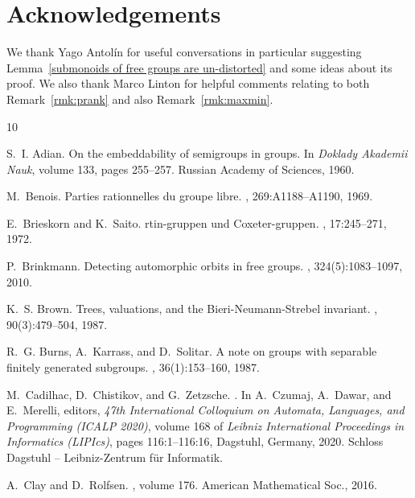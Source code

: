\documentclass[11pt]{amsart}
\theoremstyle{plain}
\theoremstyle{definition}
\begin{document}
\section*{Acknowledgements} 
We thank Yago Antol\'{i}n for useful conversations in particular suggesting Lemma~\ref{submonoids of free groups are un-distorted} and some ideas about its proof.  We also thank Marco Linton for helpful comments relating to both Remark~\ref{rmk:prank} and also Remark~\ref{rmk:maxmin}.   



\begin{thebibliography}{10}

S.~I. Adian.
\newblock On the embeddability of semigroups in groups.
\newblock In {\em Doklady Akademii Nauk}, volume 133, pages 255--257. Russian
  Academy of Sciences, 1960.

M.~Benois.
\newblock Parties rationnelles du groupe libre.
, 269:A1188--A1190, 1969.

E.~Brieskorn and K.~Saito.
rtin-gruppen und {C}oxeter-gruppen.
, 17:245--271, 1972.

P.~Brinkmann.
\newblock Detecting automorphic orbits in free groups.
, 324(5):1083--1097, 2010.

K.~S. Brown.
\newblock Trees, valuations, and the {B}ieri-{N}eumann-{S}trebel invariant.
, 90(3):479--504, 1987.

R.~G. Burns, A.~Karrass, and D.~Solitar.
\newblock A note on groups with separable finitely generated subgroups.
, 36(1):153--160, 1987.

M.~Cadilhac, D.~Chistikov, and G.~Zetzsche.
.
\newblock In A.~Czumaj, A.~Dawar, and E.~Merelli, editors, {\em 47th
  International Colloquium on Automata, Languages, and Programming (ICALP
  2020)}, volume 168 of {\em Leibniz International Proceedings in Informatics
  (LIPIcs)}, pages 116:1--116:16, Dagstuhl, Germany, 2020. Schloss Dagstuhl --
  Leibniz-Zentrum f{\"u}r Informatik.

A.~Clay and D.~Rolfsen.
, volume 176.
\newblock American Mathematical Soc., 2016.


\end{thebibliography}
\end{document}
